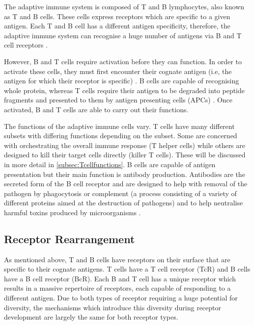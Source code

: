 The adaptive immune system is composed of T and B lymphocytes, also known as T and B cells.
These cells express receptors which are specific to a given antigen.
Each T and B cell has a different antigen specificity, therefore, the adaptive immune system can recognise a huge number of antigens via B and T cell receptors \citep{Janeway2001}.

However, B and T cells require activation before they can function.
In order to activate these cells, they must first encounter their cognate antigen (i.e, the antigen for which their receptor is specific) \citep{Parkin2001}.
B cells are capable of recognising whole protein, whereas T cells require their antigen to be degraded into peptide fragments and presented to them by antigen presenting cells (APCs) \citep{Janeway2001}.
Once activated, B and T cells are able to carry out their functions.

The functions of the adaptive immune cells vary.
T cells have many different subsets with differing functions depending on the subset.
Some are concerned with orchestrating the overall immune response (T helper cells) while others are designed to kill their target cells directly (killer T cells).
These will be discussed in more detail in \cref{subsec:Tcellfunctions}.
B cells are capable of antigen presentation but their main function is antibody production.
Antibodies are the secreted form of the B cell receptor and are designed to help with removal of the pathogen by phagocytosis or complement (a process consisting of a variety of different proteins aimed at the destruction of pathogens) and to help neutralise harmful toxins produced by microorganisms \citep{Janeway2008}.

\subsection{Receptor Rearrangement}
\label{subsec:receptorrearrangement}

As mentioned above, T and B cells have receptors on their surface that are specific to their cognate antigens.
T cells have a T cell receptor (TcR) and B cells have a B cell receptor (BcR).
Each B and T cell has a unique receptor which results in a massive repertoire of receptors, each capable of responding to a different antigen.
Due to both types of receptor requiring a huge potential for diversity, the mechanisms which introduce this diversity during receptor development are largely the same for both receptor types.


